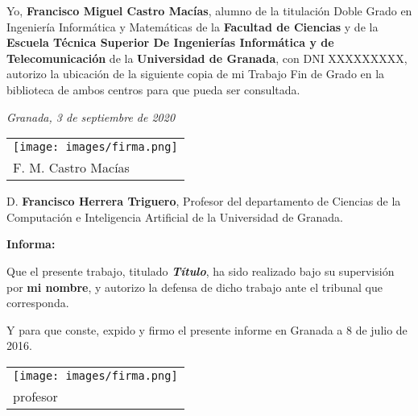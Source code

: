 
\newpage
Yo, \textbf{Francisco Miguel Castro Macías}, alumno de la titulación Doble Grado en Ingeniería Informática y Matemáticas de la \textbf{Facultad de Ciencias} y de la \textbf{Escuela Técnica Superior De Ingenierías Informática y de Telecomunicación} de la \textbf{Universidad de Granada}, con DNI XXXXXXXXX, autorizo la ubicación de la siguiente copia de mi Trabajo Fin de Grado en la biblioteca de ambos centros para que pueda ser consultada.

\bigskip

\noindent\textit{Granada, 3 de septiembre de 2020}

\vspace{3cm}

\begin{flushright}
		\begin{tabular}{@{}l@{}}
		\texttt{[image: images/firma.png]} \\
		F. M. Castro Macías \\
		\end{tabular}
\end{flushright}

\newpage


D. \textbf{Francisco Herrera Triguero}, Profesor del departamento de Ciencias de la Computación e Inteligencia Artificial de la Universidad de Granada.

\vspace{0.5cm}

\textbf{Informa:}

\vspace{0.5cm}

Que el presente trabajo, titulado \textit{\textbf{Título}}, ha sido realizado bajo su supervisión por \textbf{mi nombre}, y autorizo la defensa de dicho trabajo ante el tribunal que corresponda.

\vspace{0.5cm}

Y para que conste, expido y firmo el presente informe en Granada a 8 de julio de 2016.

\vspace{3cm}

\begin{flushright}
	\begin{tabular}{@{}l@{}}
        \texttt{[image: images/firma.png]} \\
        profesor \\
	\end{tabular}
\end{flushright}